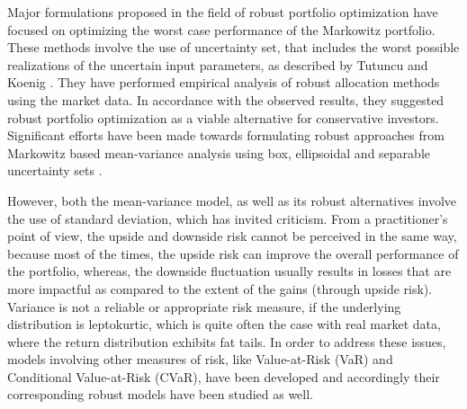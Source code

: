 \documentclass[12pt]{article}
\numberwithin{equation}{section}
\begin{document}
Major formulations proposed in the field of robust portfolio optimization have focused on optimizing the worst case performance of the Markowitz portfolio. These methods involve the use of uncertainty set, that includes the worst possible realizations of the uncertain input parameters, as described by Tutuncu and Koenig \cite{Tutuncu}. They have performed empirical analysis of robust allocation methods using the market data. In accordance with the observed results, they suggested robust portfolio optimization as a viable alternative for conservative investors. Significant efforts have been made towards formulating robust approaches from Markowitz based mean-variance analysis using box, ellipsoidal \cite{Fabozzi,Kim} and separable uncertainty sets \cite{Lu,Tutuncu}.

However, both the mean-variance model, as well as its robust alternatives involve the use of standard deviation, which has invited criticism. From a practitioner's point of view, the upside and downside risk cannot be perceived in the same way, because most of the times, the upside risk can improve the overall performance of the portfolio, whereas, the downside fluctuation usually results in losses that are more impactful as compared to the extent of the gains (through upside risk). Variance is not a reliable or appropriate  risk measure, if the underlying distribution is leptokurtic, which is quite often the case with real market data, where the return distribution exhibits fat tails. In order to address these issues, models involving other measures of risk, like Value-at-Risk (VaR) and Conditional Value-at-Risk (CVaR), have been developed and accordingly their corresponding robust models have been studied as well.
\end{document}
